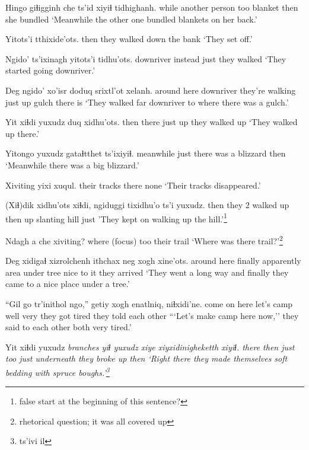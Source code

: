 \documentclass[12pt]{article}
\begin{document}
\gll Hingo giɬigginh che ts'id xiyiɬ tidhighanh.
while {another person} too blanket then {she bundled}
\glt `Meanwhile the other one bundled blankets on her back.'
\glend

\gll Yitots'i tthixide'ots.
then {they walked down the bank}
\glt `They set off.'
\glend

\gll Ngido' ts'ixinagh yitots'i tidhu'ots.
{downriver} instead just {they walked}
\glt `They started going downriver.'
\glend

\gll Deg ngido' xo'isr doduq srixtl'ot xelanh.
{around here} downriver {they're walking} {just up} gulch {there is}
\glt `They walked far downriver to where there was a gulch.'
\glend

\gll Yit xiɬdi yuxudz duq xidhu'ots.
then there just up {they walked up}
\glt `They walked up there.'
\glend

\gll Yitongo yuxudz gataɬtthet ts'ixiyiɬ.
meanwhile just {there was a blizzard} then
\glt `Meanwhile there was a big blizzard.'
\glend

\gll Xiviting yixi xuqul.
{their tracks} there none
\glt `Their tracks disappeared.'
\glend

\gll {***} (Xiɬ)dik xidhu'ots xiɬdi, ngiduggi tixidhu'o ts'i yuxudz.
{} then {they 2 walked up} then  up {slanting hill} {} just
\glt 'They kept on walking up the hill.'\footnote{false start at the beginning of this sentence?}
\glend

\gll Ndagh a che xiviting?
where {(focus)} too {their trail}
\glt `Where was there trail?'\footnote{rhetorical question; it was all covered up}
\glend

\gll Deg xidigaɬ xizrolchenh ithchax neg xogh xine'ots.
{around here} finally apparently {area under tree} nice {to it} {they arrived}
\glt `They went a long way and finally they came to a nice place under a tree.'
\glend

\gll ``Gil go tr'inithol ngo,'' getiy {xogh enatlniq}, niɬxidi'ne.
{come on} here {let's camp} well very {they got tired} {they told each other}
\glt ```Let's make camp here now,'' they said to each other both very tired.'
\glend

\gll Yit xiɬdi yuxudz \em branches yiɬ yuxudz xiye xiyxidinigheketth xiyiɬ.
there then just {} too just underneath {they broke up} then
\glt `Right there they made themselves soft bedding with spruce boughs.'\footnote{ts'ivi il}
\glend
\end{document}
